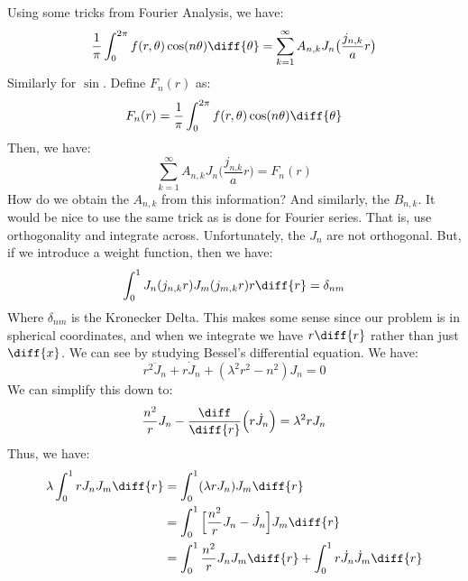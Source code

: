             Using some tricks from Fourier Analysis, we have:
            \begin{equation}
                \frac{1}{\pi}\int_{0}^{2\pi}
                    f(r,\theta)\cos(n\theta)\diff{\theta}
                =\sum_{k=1}^{\infty}A_{n,k}
                    J_{n}\big(\frac{j_{n,k}}{a}r\big)
            \end{equation}
            Similarly for $\sin$. Define $F_{n}(r)$ as:
            \begin{equation}
                F_{n}(r)=\frac{1}{\pi}\int_{0}^{2\pi}
                    f(r,\theta)\cos(n\theta)\diff{\theta}
            \end{equation}
            Then, we have:
            \begin{equation}
                \sum_{k=1}^{\infty}A_{n,k}J_{n}
                    \big(\frac{j_{n.k}}{a}r\big)
                =F_{n}(r)
            \end{equation}
            How do we obtain the $A_{n,k}$ from this information?
            And similarly, the $B_{n,k}$. It would be nice to use
            the same trick as is done for Fourier series. That is,
            use orthogonality and integrate across. Unfortunately,
            the $J_{n}$ are not orthogonal. But, if we introduce
            a weight function, then we have:
            \begin{equation}
                \int_{0}^{1}J_{n}(j_{n,k}r)J_{m}(j_{m,k}r)r\diff{r}
                =\delta_{nm}
            \end{equation}
            Where $\delta_{nm}$ is the Kronecker Delta. This makes
            some sense since our problem is in spherical
            coordinates, and when we integrate we have
            $r\diff{r}$ rather than just $\diff{x}$. We can see
            by studying Bessel's differential equation. We have:
            \begin{equation}
                r^{2}\ddot{J}_{n}+r\dot{J}_{n}+
                (\lambda^{2}r^{2}-n^{2})J_{n}=0
            \end{equation}
            We can simplify this down to:
            \begin{equation}
                \frac{n^{2}}{r}J_{n}-\frac{\diff}{\diff{r}}\Big(
                    r\dot{J}_{n}\Big)
                =\lambda^{2}rJ_{n}
            \end{equation}
            Thus, we have:
            \begin{subequations}
                \begin{align}
                    \lambda\int_{0}^{1}rJ_{n}J_{m}\diff{r}
                    &=\int_{0}^{1}(\lambda{r}J_{n})J_{m}\diff{r}\\
                    &=\int_{0}^{1}\Big[\frac{n^{2}}{r}J_{n}-
                        \dot{J}_{n}\Big]
                        J_{m}\diff{r}\\
                    &=\int_{0}^{1}\frac{n^{2}}{r}J_{n}J_{m}\diff{r}+
                        \int_{0}^{1}r\dot{J}_{n}\dot{J}_{m}\diff{r}
                \end{align}
            \end{subequations}
